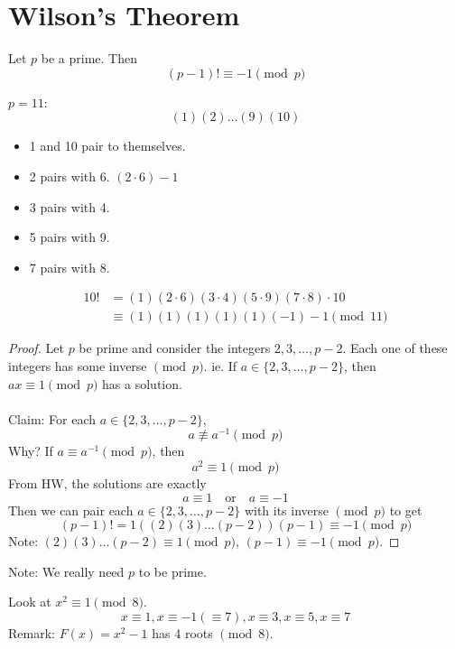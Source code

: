 \section{Wilson's Theorem}
    \begin{theorem} 
        Let $p$ be a prime. Then
        \[ (p-1)!\equiv -1\pmod{p} \]
        \begin{example}
            $p=11$:
            \[ (1)(2)\dots(9)(10) \]
            \begin{itemize}
                \item 1 and 10 pair to themselves.
                \item 2 pairs with 6. $(2\cdot 6)-1$
                \item 3 pairs with 4.
                \item 5 pairs with 9.
                \item 7 pairs with 8.
            \end{itemize}
            \begin{align*}
                10! &= (1)(2\cdot 6)(3\cdot 4)(5\cdot 9)(7\cdot 8)\cdot 10 \\
                &\equiv (1)(1)(1)(1)(1)(-1) - 1 \pmod{11}
            \end{align*}
        \end{example}
        \begin{proof}
            Let $p$ be prime and consider the integers $2,3,\dots,p-2$.
            Each one of these integers has some inverse $\pmod{p}$.
            ie. If $a\in\{ 2,3,\dots,p-2 \}$, then $ax\equiv 1\pmod{p}$
            has a solution. \\\\
            Claim: For each $a\in\{ 2,3,\dots,p-2 \}$,
            \[ a\not\equiv a^{-1} \pmod{p} \]
            Why? If $a\equiv a^{-1}\pmod{p}$, then
            \[ a^2\equiv 1\pmod{p} \]
            From HW, the solutions are exactly 
            \[ a\equiv 1 \quad\text{or}\quad a\equiv -1 \]
            Then we can pair each $a\in\{ 2,3,\dots,p-2 \}$ with its inverse
            $\pmod{p}$ to get 
            \[ (p-1)! = 1((2)(3)\dots(p-2))(p-1) \equiv -1 \pmod{p} \]
            Note: $(2)(3)\dots(p-2)\equiv 1\pmod{p}$, $(p-1)\equiv -1\pmod{p}$.
        \end{proof}
        Note: We really need $p$ to be prime.
        \begin{example}
            Look at $x^2\equiv 1\pmod{8}$.
            \[ x\equiv 1, x\equiv -1(\equiv 7), x\equiv 3, x\equiv 5, x\equiv 7 \]
            Remark: $F(x) = x^2 - 1$ has 4 roots $\pmod{8}$. 
        \end{example}
    \end{theorem}

